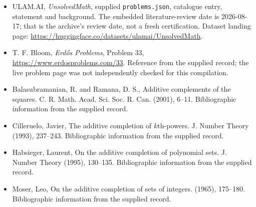 \documentclass[11pt,a4paper]{article}
\begin{document}
{\small

\begin{itemize}

\item[\hypertarget{source:statement:1}{S1}] ULAM.AI, \emph{UnsolvedMath}, supplied \texttt{problems.json}, catalogue entry, statement and background. The embedded literature-review date is 2026-08-17; that is the archive’s review date, not a fresh certification. Dataset landing page: \url{https://huggingface.co/datasets/ulamai/UnsolvedMath}.

\item[\hypertarget{source:statement:2}{S2}] T. F. Bloom, \emph{Erdős Problems}, Problem 33, \url{https://www.erdosproblems.com/33}. Reference from the supplied record; the live problem page was not independently checked for this compilation.

\item[\hypertarget{source:statement:3}{S3}] Balasubramanian, R. and Ramana, D. S., Additive complements of the squares. C. R. Math. Acad. Sci. Soc. R. Can. (2001), 6--11. Bibliographic information from the supplied record.

\item[\hypertarget{source:statement:4}{S4}] Cilleruelo, Javier, The additive completion of {$k$}th-powers. J. Number Theory (1993), 237--243. Bibliographic information from the supplied record.

\item[\hypertarget{source:statement:5}{S5}] Habsieger, Laurent, On the additive completion of polynomial sets. J. Number Theory (1995), 130--135. Bibliographic information from the supplied record.

\item[\hypertarget{source:statement:6}{S6}] Moser, Leo, On the additive completion of sets of integers. (1965), 175--180. Bibliographic information from the supplied record.

\end{itemize}

}

\label{end:statement}
\end{document}
